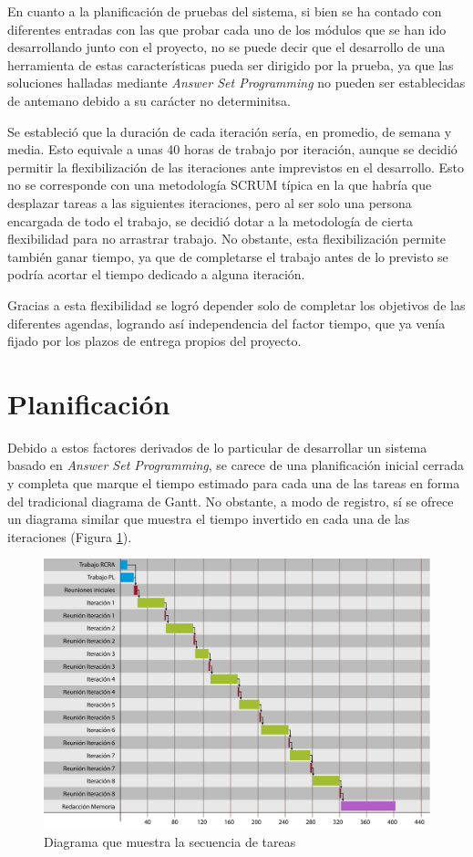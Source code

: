 En cuanto a la planificación de pruebas del sistema, si bien se ha contado con diferentes entradas con las que probar cada uno de los módulos que se han ido desarrollando junto con el proyecto, no se puede decir que el desarrollo de una herramienta de estas características pueda ser dirigido por la prueba, ya que las soluciones halladas mediante \textit{Answer Set Programming} no pueden ser establecidas de antemano debido a su carácter no determinitsa.

Se estableció que la duración de cada iteración sería, en promedio, de semana y media. Esto equivale a unas 40 horas de trabajo por iteración, aunque se decidió permitir la flexibilización de las iteraciones ante imprevistos en el desarrollo. Esto no se corresponde con una metodología SCRUM típica en la que habría que desplazar tareas a las siguientes iteraciones, pero al ser solo una persona encargada de todo el trabajo, se decidió dotar a la metodología de cierta flexibilidad para no arrastrar trabajo. No obstante, esta flexibilización permite también ganar tiempo, ya que de completarse el trabajo antes de lo previsto se podría acortar el tiempo dedicado a alguna iteración.

Gracias a esta flexibilidad se logró depender solo de completar los objetivos de las diferentes agendas, logrando así independencia del factor tiempo, que ya venía fijado por los plazos de entrega propios del proyecto. 

\section{Planificación}
\label{sec:planning}
Debido a estos factores derivados de lo particular de desarrollar un sistema basado en \textit{Answer Set Programming}, se carece de una planificación inicial cerrada y completa que marque el tiempo estimado para cada una de las tareas en forma del tradicional diagrama de Gantt. No obstante, a modo de registro, sí se ofrece un diagrama similar que muestra el tiempo invertido en cada una de las iteraciones (Figura \ref{fig:tareas}).

\begin{figure}
	\centering
	\includegraphics[width=0.8\linewidth]{imagenes/diagrama_tareas.pdf}
	\caption{Diagrama que muestra la secuencia de tareas}
	\label{fig:tareas}
\end{figure}

